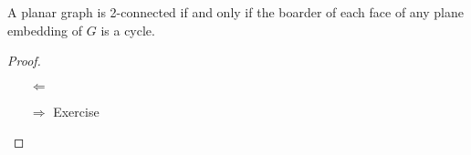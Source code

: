\documentclass[aagt.tex]{subfiles}
\begin{document}
\begin{prop}\label{p_4_2}
  A planar graph is 2-connected if and only if the boarder of each face of any plane embedding of $G$ is a cycle.
\end{prop}

\begin{proof}
  \begin{enumerate}
    \item[$\Leftarrow$] 
    \item[$\Rightarrow$] Exercise
  \end{enumerate}
\end{proof}
\end{document}
